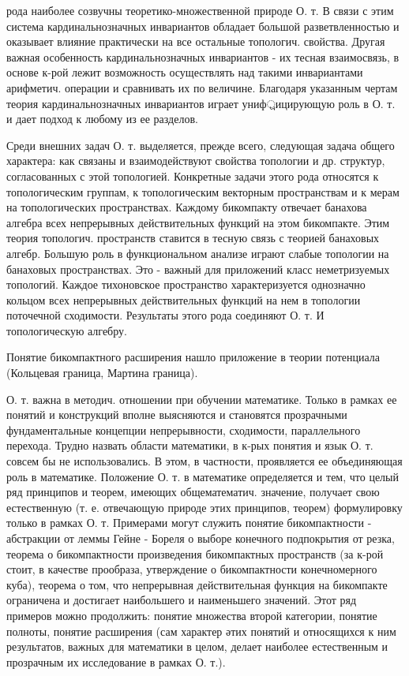 \documentclass[10pt]{article}
\begin{document}
рода наиболее созвучны теоретико-множественной природе О. т. В связи с этим система кардинальнозначных инвариантов обладает большой разветвленностью и оказывает влияние практически на все остальные топологич. свойства. Другая важная особенность кардинальнозначных инвариантов - их тесная взаимосвязь, в основе к-рой лежит возможность осуществлять над такими инвариантами арифметич. операции и сравнивать их по величине. Благодаря указанным чертам теория кардинальнозначных инвариантов играет униф্রицирующую роль в О. т. и дает подход к любому из ее разделов.



Среди внешних задач О. т. выделяется, прежде всего, следующая задача общего характера: как связаны и взаимодействуют свойства топологии и др. структур, согласованных с этой топологией. Конкретные задачи этого рода относятся к топологическим группам, к топологическим векторным пространствам и к мерам на топологических пространствах. Каждому бикомпакту отвечает банахова алгебра всех непрерывных действительных функций на этом бикомпакте. Этим теория топологич. пространств ставится в тесную связь с теорией банаховых алгебр. Большую роль в функциональном анализе играют слабые топологии на банаховых пространствах. Это - важный для приложений класс неметризуемых топологий. Каждое тихоновское пространство характеризуется однозначно кольцом всех непрерывных действительных функций на нем в топологии поточечной сходимости. Результаты этого рода соединяют О. т. И топологическую алгебру.



Понятие бикомпактного расширения нашло приложение в теории потенциала (Кольцевая граница, Мартина граница).



О. т. важна в методич. отношении при обучении математике. Только в рамках ее понятий и конструкций вполне выясняются и становятся прозрачными фундаментальные концепции непрерывности, сходимости, параллельного перехода. Трудно назвать области математики, в к-рых понятия и язык О. т. совсем бы не использовались. В этом, в частности, проявляется ее объединяющая роль в математике. Положение О. т. в математике определяется и тем, что целый ряд принципов и теорем, имеющих общематематич. значение, получает свою естественную (т. е. отвечающую природе этих принципов, теорем) формулировку только в рамках О. т. Примерами могут служить понятие бикомпактности - абстракции от леммы Гейне - Бореля о выборе конечного подпокрытия от резка, теорема о бикомпактности произведения бикомпактных пространств (за к-рой стоит, в качестве прообраза, утверждение о бикомпактности конечномерного куба), теорема о том, что непрерывная действительная функция на бикомпакте ограничена и достигает наибольшего и наименьшего значений. Этот ряд примеров можно продолжить: понятие множества второй категории, понятие полноты, понятие расширения (сам характер әтих понятий и относящихся к ним результатов, важных для математики в целом, делает наиболее естественным и прозрачным их исследование в рамках О. т.).
\end{document}
